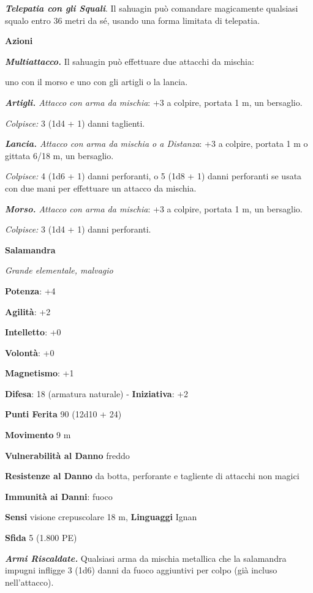 \begin{multicols}{2}
\emph{\textbf{Telepatia con gli Squali}}. Il sahuagin può comandare
magicamente qualsiasi squalo entro 36 metri da sé, usando una forma
limitata di telepatia.

\smallskip\textbf{Azioni}

\emph{\textbf{Multiattacco.}} Il sahuagin può effettuare due attacchi da
mischia:

uno con il morso e uno con gli artigli o la lancia.

\emph{\textbf{Artigli.} Attacco con arma da mischia}: +3 a colpire,
portata 1 m, un bersaglio.

\emph{Colpisce:} 3 (1d4 + 1) danni taglienti.

\emph{\textbf{Lancia.} Attacco con arma da mischia o a Distanza}: +3 a
colpire, portata 1 m o gittata 6/18 m, un bersaglio.

\emph{Colpisce:} 4 (1d6 + 1) danni perforanti, o 5 (1d8 + 1) danni
perforanti se usata con due mani per effettuare un attacco da mischia.

\emph{\textbf{Morso.} Attacco con arma da mischia}: +3 a colpire,
portata 1 m, un bersaglio.

\emph{Colpisce:} 3 (1d4 + 1) danni perforanti.

\textbf{Salamandra}

\emph{Grande elementale, malvagio}

\textbf{Potenza}: +4

\textbf{Agilità}: +2

\textbf{Intelletto}: +0

\textbf{Volontà}: +0

\textbf{Magnetismo}: +1

\textbf{Difesa}: 18 (armatura naturale) - \textbf{Iniziativa}: +2

\textbf{Punti Ferita} 90 (12d10 + 24)

\textbf{Movimento} 9 m

\textbf{Vulnerabilità al Danno} freddo

\textbf{Resistenze al Danno} da botta, perforante e tagliente di
attacchi non magici

\textbf{Immunità ai Danni}: fuoco

\textbf{Sensi} visione crepuscolare 18 m, 
\textbf{Linguaggi} Ignan

\textbf{Sfida} 5 (1.800 PE)\smallskip

\emph{\textbf{Armi Riscaldate.}} Qualsiasi arma da mischia metallica che
la salamandra impugni infligge 3 (1d6) danni da fuoco aggiuntivi per
colpo (già incluso nell'attacco).


\end{multicols}
